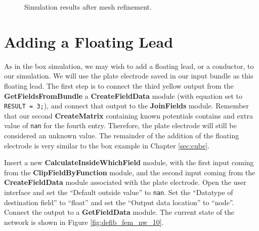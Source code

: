 \documentclass[fleqn,11pt,openany]{book}
\begin{document}
\begin{figure}
\caption{Simulation results after mesh
refinement.}\label{fig:defib_fem_r_09}
\end{figure}

\section{Adding a Floating Lead}

As in the box simulation, we may wish to add a floating lead, or a
conductor, to our simulation. We will use the plate electrode saved in
our input bundle as this floating lead. The first step is to connect
the third yellow output from the {\bf GetFieldsFromBundle} a
{\bf CreateFieldData} module (with equation set to {\tt
RESULT = 3;}), and connect that output to the {\bf JoinFields}
module. Remember that our second {\bf CreateMatrix} containing known
potentials contains and extra value of {\tt nan} for the fourth
entry. Therefore, the plate electrode will still be considered an
unknown value. The remainder of the addition of the floating electrode
is very similar to the box example in Chapter \ref{sec:cube}.

Insert a new {\bf CalculateInsideWhichField} module, with the first
input coming from the {\bf ClipFieldByFunction} module, and the second
input coming from the {\bf CreateFieldData} module associated with the
plate electrode. Open the user interface and set the ``Default outside
value'' to {\tt nan}. Set the ``Datatype of destination field'' to
``float'' and set the ``Output data location'' to ``node''. Connect
the output to a {\bf GetFieldData} module. The current state of the
network is shown in Figure \ref{fig:defib_fem_nw_10}.
\end{document}

